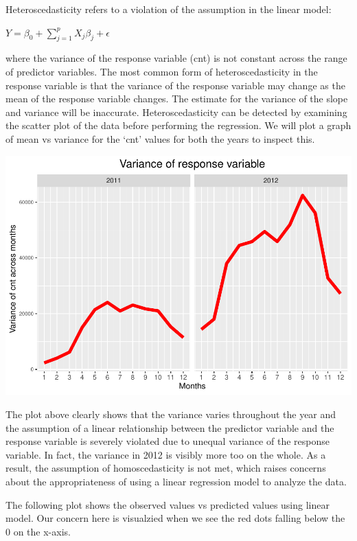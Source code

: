 \documentclass[
]{article}
\begin{document}
Heteroscedasticity refers to a violation of the assumption in the linear
model:

\(Y = \beta_{0} + \sum\limits_{j=1} ^ {p} X_{j}\beta_{j} + \epsilon\)

where the variance of the response variable (cnt) is not constant across
the range of predictor variables. The most common form of
heteroscedasticity in the response variable is that the variance of the
response variable may change as the mean of the response variable
changes. The estimate for the variance of the slope and variance will be
inaccurate. Heteroscedasticity can be detected by examining the scatter
plot of the data before performing the regression. We will plot a graph
of mean vs variance for the `cnt' values for both the years to inspect
this.

\includegraphics{test_files/figure-latex/unnamed-chunk-7-1.pdf}

The plot above clearly shows that the variance varies throughout the
year and the assumption of a linear relationship between the predictor
variable and the response variable is severely violated due to unequal
variance of the response variable. In fact, the variance in 2012 is
visibly more too on the whole. As a result, the assumption of
homoscedasticity is not met, which raises concerns about the
appropriateness of using a linear regression model to analyze the data.

The following plot shows the observed values vs predicted values using
linear model. Our concern here is visualzied when we see the red dots
falling below the 0 on the x-axis.
\end{document}
